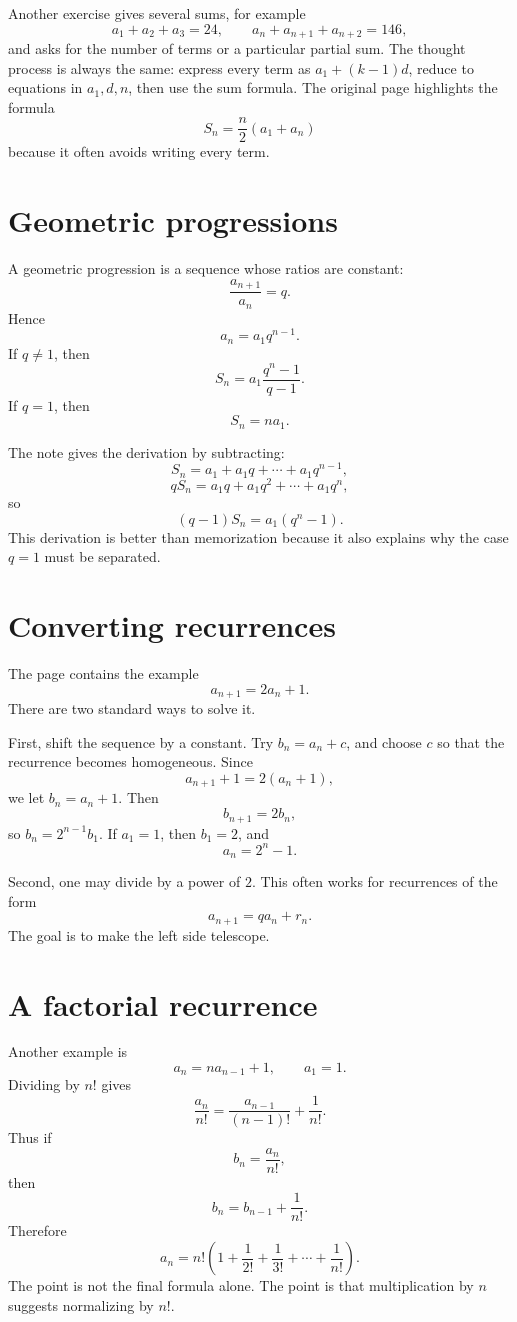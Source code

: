 Another exercise gives several sums, for example
\[
  a_1+a_2+a_3=24,\qquad a_n+a_{n+1}+a_{n+2}=146,
\]
and asks for the number of terms or a particular partial sum.  The thought process is always the same: express every term as \(a_1+(k-1)d\), reduce to equations in \(a_1,d,n\), then use the sum formula.  The original page highlights the formula
\[
  S_n=\frac n2(a_1+a_n)
\]
because it often avoids writing every term.

\section{Geometric progressions}

A geometric progression is a sequence whose ratios are constant:
\[
  \frac{a_{n+1}}{a_n}=q.
\]
Hence
\[
  a_n=a_1q^{n-1}.
\]
If \(q\neq1\), then
\[
  S_n=a_1\frac{q^n-1}{q-1}.
\]
If \(q=1\), then
\[
  S_n=na_1.
\]

The note gives the derivation by subtracting:
\[
  S_n=a_1+a_1q+\cdots+a_1q^{n-1},
\]
\[
  qS_n=a_1q+a_1q^2+\cdots+a_1q^n,
\]
so
\[
  (q-1)S_n=a_1(q^n-1).
\]
This derivation is better than memorization because it also explains why the case \(q=1\) must be separated.

\section{Converting recurrences}

The page contains the example
\[
  a_{n+1}=2a_n+1.
\]
There are two standard ways to solve it.

First, shift the sequence by a constant.  Try \(b_n=a_n+c\), and choose \(c\) so that the recurrence becomes homogeneous.  Since
\[
  a_{n+1}+1=2(a_n+1),
\]
we let \(b_n=a_n+1\).  Then
\[
  b_{n+1}=2b_n,
\]
so \(b_n=2^{n-1}b_1\).  If \(a_1=1\), then \(b_1=2\), and
\[
  a_n=2^n-1.
\]

Second, one may divide by a power of \(2\).  This often works for recurrences of the form
\[
  a_{n+1}=qa_n+r_n.
\]
The goal is to make the left side telescope.

\section{A factorial recurrence}

Another example is
\[
  a_n=na_{n-1}+1,\qquad a_1=1.
\]
Dividing by \(n!\) gives
\[
  \frac{a_n}{n!}=\frac{a_{n-1}}{(n-1)!}+\frac1{n!}.
\]
Thus if
\[
  b_n=\frac{a_n}{n!},
\]
then
\[
  b_n=b_{n-1}+\frac1{n!}.
\]
Therefore
\[
  a_n=n!\left(1+\frac1{2!}+\frac1{3!}+\cdots+\frac1{n!}\right).
\]
The point is not the final formula alone.  The point is that multiplication by \(n\) suggests normalizing by \(n!\).

